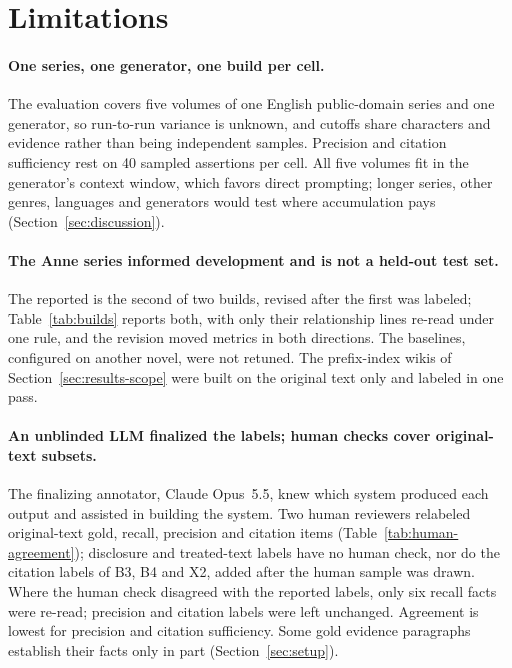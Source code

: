 \section*{Limitations}
\label{sec:limitations}

\paragraph{One series, one generator, one build per cell.}
The evaluation covers five volumes of one English public-domain series and one generator,
so run-to-run variance is unknown, and cutoffs share characters and evidence rather than
being independent samples. Precision and citation sufficiency rest on 40 sampled assertions
per cell. All five volumes fit in the generator's context window, which favors direct
prompting; longer series, other genres, languages and generators would test where
accumulation pays (Section~\ref{sec:discussion}).

\paragraph{The Anne series informed development and is not a held-out test set.}
The reported \sys is the second of two builds, revised after the first was labeled;
Table~\ref{tab:builds} reports both, with only their relationship lines re-read under one
rule, and the revision moved metrics in both directions. The baselines, configured on another novel, were not retuned. The prefix-index
wikis of Section~\ref{sec:results-scope} were built on the original text only and labeled in
one pass.

\paragraph{An unblinded LLM finalized the labels; human checks cover original-text subsets.}
The finalizing annotator, Claude Opus~5.5, knew which system produced each output and
assisted in building the system. Two human reviewers relabeled original-text gold, recall,
precision and citation items (Table~\ref{tab:human-agreement}); disclosure and treated-text
labels have no human check, nor do the citation labels of B3, B4 and X2, added after the
human sample was drawn. Where the human check disagreed with the reported labels, only six
recall facts were re-read; precision and citation labels were left unchanged. Agreement is
lowest for precision and citation sufficiency. Some gold evidence paragraphs establish their facts only in part
(Section~\ref{sec:setup}).

